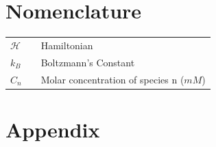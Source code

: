 \documentclass[10pt,a4paper,twoside]{article}
\begin{document}
\section{Nomenclature} 
   \begin{tabulary}{1.0\textwidth}{LCL}
   $\mathcal{H}$ &   & Hamiltonian \\
   $k_B$ & & Boltzmann's Constant\\
   $C_n$ &   & Molar concentration of species n ($mM$) \\
   \end{tabulary}


\vfill
\newpage
\section{Appendix}
\label{sec:appendix}
\setcounter{page}{1}
%
%
%
\end{document}
